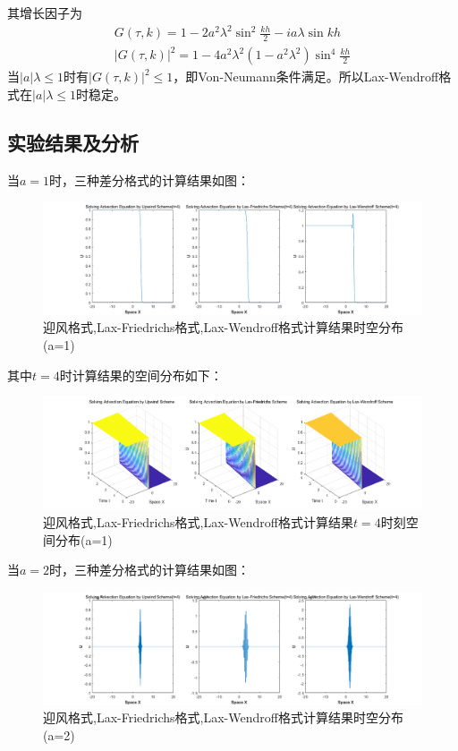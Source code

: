 \documentclass[fontset=mac]{ctexart}
\begin{document}
	其增长因子为
	$$
	\begin{array}{l}
		G(\tau, k)=1-2 a^{2} \lambda^{2} \sin ^{2} \frac{k h}{2}-i a \lambda \sin k h \\
		|G(\tau, k)|^{2}=1-4 a^{2} \lambda^{2}\left(1-a^{2} \lambda^{2}\right) \sin ^{4} \frac{k h}{2}
	\end{array}
	$$
	当$|a|\lambda \le 1$时有$|G(\tau , k)|^2 \le 1$，即Von-Neumann条件满足。所以Lax-Wendroff格式在$|a|\lambda \le 1$时稳定。
	
	\subsection{实验结果及分析}
	当$a=1$时，三种差分格式的计算结果如图：
	\begin{figure}[H]
		\centering
		\includegraphics[width=\linewidth]{fig/fig4}
		\caption{迎风格式,Lax-Friedrichs格式,Lax-Wendroff格式计算结果时空分布(a=1)}
	\end{figure}

	其中$t=4$时计算结果的空间分布如下：
	\begin{figure}[H]
		\centering
		\includegraphics[width=\linewidth]{fig/fig5}
		\caption{迎风格式,Lax-Friedrichs格式,Lax-Wendroff格式计算结果$t=4$时刻空间分布(a=1)}
	\end{figure}

	当$a=2$时，三种差分格式的计算结果如图：
	\begin{figure}[H]
		\centering
		\includegraphics[width=\linewidth]{fig/fig6}
		\caption{迎风格式,Lax-Friedrichs格式,Lax-Wendroff格式计算结果时空分布(a=2)}
	\end{figure}
	
\end{document}
